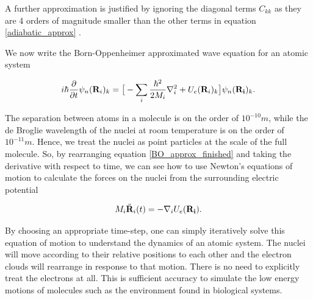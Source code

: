 A further approximation is justified by ignoring the diagonal terms $C_{kk}$ as they are 4 orders of magnitude smaller than the other terms in equation \ref{adiabatic_approx} \cite{sherrill}.

We now write the Born-Oppenheimer approximated wave equation for an atomic system  

\begin{equation}
	\label{BO_approx_finished}
	i\hbar \frac{\partial}{\partial t} \psi_n(\bold{R}_i)_k = \big[ -\sum_i \frac{\hbar^2}{2M_i} \nabla^2_i + U_e(\bold{R}_i)_k\big] \psi_n(\bold{R_i})_k.
\end{equation}

The separation between atoms in a molecule is on the order of $10^{-10}m$, while the de Broglie wavelength of the nuclei at room temperature is on the order of $10^{-11}m$. Hence, we treat the nuclei as point particles at the scale of the full molecule. So, by rearranging equation \ref{BO_approx_finished} and taking the derivative with respect to time, we can see how to use Newton's equations of motion to calculate the forces on the nuclei from the surrounding electric potential 

\begin{equation}
	M_i \ddot{\bold{R}}_i (t) = -\nabla_i U_e (\bold{R_i}).
	\label{Newtons_equations}
\end{equation}

By choosing an appropriate time-step, one can simply iteratively solve this equation of motion to understand the dynamics of an atomic system. The nuclei will move according to their relative positions to each other and the electron clouds will rearrange in response to that motion. There is no need to explicitly treat the electrons at all. This is sufficient accuracy to simulate the low energy motions of molecules such as the environment found in biological systems. 
%




%
%
%


